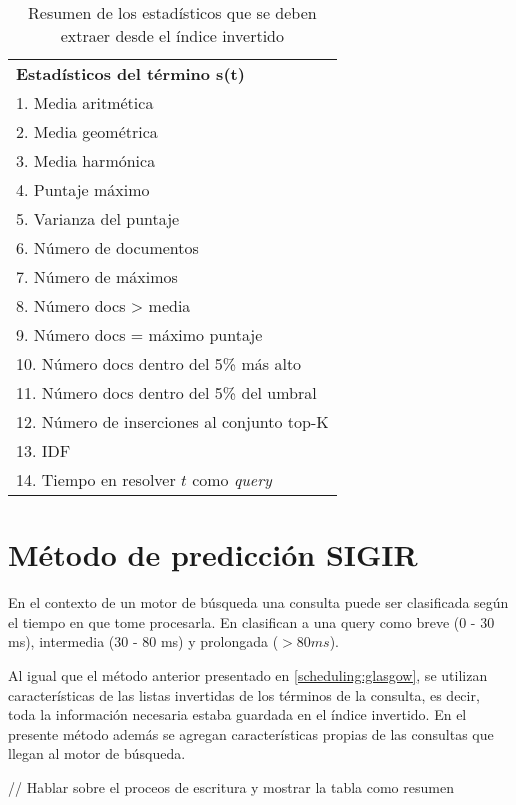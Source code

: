 \begin{table}[H]
\centering
\caption{Resumen de los estadísticos que se deben extraer desde el índice invertido}
\label{tabla:estadisticosGlasgow}
\begin{tabular}{|l|}
	\hline
	\textbf{Estadísticos del término s(t)} \\	
	1. Media aritmética	 \\ \hline
	2. Media geométrica	 \\ \hline
	3. Media harmónica	 \\ \hline
	4. Puntaje máximo	 \\ \hline
	5. Varianza del puntaje	 \\ \hline
	6. Número de documentos	 \\ \hline
	7. Número de máximos	 \\ \hline
	8. Número docs > media	 \\ \hline
	9. Número docs = máximo puntaje	 \\ \hline
	10. Número docs dentro del 5\% más alto	 \\ \hline
	11. Número docs dentro del 5\% del umbral	 \\ \hline
	12. Número de inserciones al conjunto top-K	 \\ \hline
	13. IDF	 \\ \hline
	14. Tiempo en resolver $t$ como \textit{query}	\\ \hline  
\end{tabular}
\end{table}


\section{Método de predicción SIGIR}
\label{scheduling:sigir}
En el contexto de un motor de búsqueda una consulta puede ser clasificada según el tiempo en que tome procesarla. En \citep{Jeon:2014} clasifican a una query como breve (0 - 30 ms), intermedia (30 - 80 ms) y prolongada ($ > 80 ms$). 


Al igual que el método anterior presentado en \ref{scheduling:glasgow}, se utilizan características de las listas invertidas de los términos de la consulta, es decir, toda la información necesaria estaba guardada en el índice invertido. En el presente método además se agregan características propias de las consultas que llegan al motor de búsqueda. 

// Hablar sobre el proceos de escritura y mostrar la tabla como resumen


